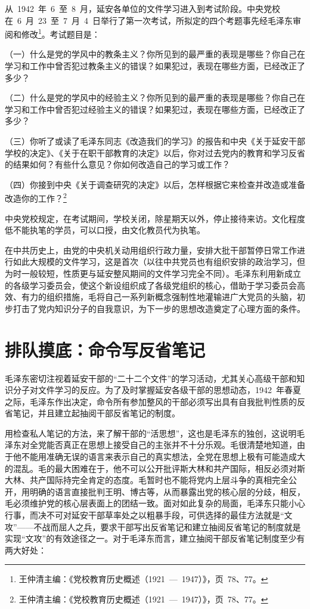 从~1942~年~6~至~8~月，延安各单位的文件学习进入到考试阶段。中央党校在~6~月~23~至~7~月~4~日举行了第一次考试，所拟定的四个考题事先经毛泽东审阅和修改\footnote{王仲清主编：《党校教育历史概述（1921~—~1947）》，页~78、77。}。考试题目是：

（一）什么是党的学风中的教条主义？你所见到的最严重的表现是哪些？你自己在学习和工作中曾否犯过教条主义的错误？如果犯过，表现在哪些方面，已经改正了多少？

（二）什么是党的学风中的经验主义？你所见到的最严重的表现是哪些？你自己在学习和工作中曾否犯过经验主义的错误？如果犯过，表现在哪些方面，已经改正了多少？

（三）你听了或读了毛泽东同志《改造我们的学习》的报告和中央《关于延安干部学校的决定》、《关于在职干部教育的决定》以后，你对过去党内的教育和学习反省的结果如何？有些什么意见？你如何改造自己的学习或工作？

（四）你接到中央《关于调查研究的决定》以后，怎样根据它来检查并改造或准备改造你的工作？\footnote{王仲清主编：《党校教育历史概述（1921~—~1947）》，页~78、77。}

中央党校规定，在考试期间，学校关闭，除星期天以外，停止接待来访。文化程度低不能执笔的学员，可以口授，由文化教员代为执笔。

在中共历史上，由党的中央机关动用组织行政力量，安排大批干部暂停日常工作进行如此大规模的文件学习，这是首次（以往中共党员也有组织安排的政治学习，但为时一般较短，性质更与延安整风期间的文件学习完全不同）。毛泽东利用新成立的各级学习委员会，使这个新设组织成了各级党组织的核心，借助于学习委员会高效、有力的组织措施，毛将自己一系列新概念强制性地灌输进广大党员的头脑，初步打击了党内知识分子的自我意识，为下一步的思想改造奠定了心理方面的条件。

\section{排队摸底：命令写反省笔记}

毛泽东密切注视着延安干部的“二十二个文件”的学习活动，尤其关心高级干部和知识分子对文件学习的反应。为了及时掌握延安各级干部的思想动态，1942~年春夏之际，毛泽东作出决定，命令所有参加整风的干部必须写出具有自我批判性质的反省笔记，并且建立起抽阅干部反省笔记的制度。

用检查私人笔记的方法，来了解干部的“活思想”，这也是毛泽东的独创，这说明毛泽东对全党能否真正在思想上接受自己的主张并不十分乐观。毛很清楚地知道，由于他不能用准确无误的语言来表示自己的真实想法，全党在思想上极有可能造成大的混乱。毛的最大困难在于，他不可以公开批评斯大林和共产国际，相反必须对斯大林、共产国际持完全肯定的态度。毛暂时也不能将党内上层斗争的真相完全公开，用明确的语言直接批判王明、博古等，从而暴露出党的核心层的分歧，相反，毛必须维护党的核心层表面上的团结一致。面对如此复杂的局面，毛泽东只能小心行事，而决不可对延安干部草率处之以粗暴手段，可供选择的最佳方法就是“文攻”——不战而屈人之兵，要求干部写出反省笔记和建立抽阅反省笔记的制度就是实现“文攻”的有效途径之一。对于毛泽东而言，建立抽阅干部反省笔记制度至少有两大好处：

